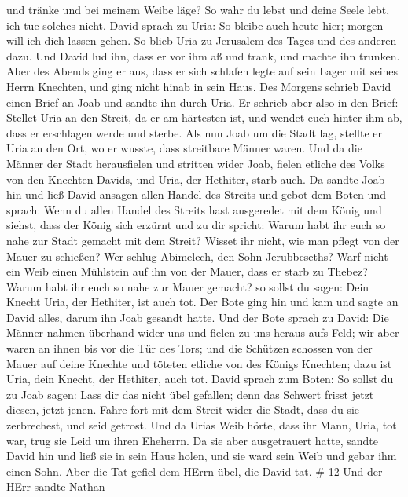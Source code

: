 und tränke und bei meinem Weibe läge? So wahr du lebst und deine Seele
lebt, ich tue solches nicht.  David sprach zu Uria: So
bleibe auch heute hier; morgen will ich dich lassen gehen. So blieb Uria
zu Jerusalem des Tages und des anderen dazu.  Und David lud
ihn, dass er vor ihm aß und trank, und machte ihn trunken. Aber des
Abends ging er aus, dass er sich schlafen legte auf sein Lager mit
seines Herrn Knechten, und ging nicht hinab in sein Haus. 
Des Morgens schrieb David einen Brief an Joab und sandte ihn durch Uria.
 Er schrieb aber also in den Brief: Stellet Uria an den
Streit, da er am härtesten ist, und wendet euch hinter ihm ab, dass er
erschlagen werde und sterbe.  Als nun Joab um die Stadt
lag, stellte er Uria an den Ort, wo er wusste, dass streitbare Männer
waren.  Und da die Männer der Stadt herausfielen und
stritten wider Joab, fielen etliche des Volks von den Knechten Davids,
und Uria, der Hethiter, starb auch.  Da sandte Joab hin und
ließ David ansagen allen Handel des Streits  und gebot dem
Boten und sprach: Wenn du allen Handel des Streits hast ausgeredet mit
dem König  und siehst, dass der König sich erzürnt und zu
dir spricht: Warum habt ihr euch so nahe zur Stadt gemacht mit dem
Streit? Wisset ihr nicht, wie man pflegt von der Mauer zu schießen?
 Wer schlug Abimelech, den Sohn Jerubbeseths? Warf nicht
ein Weib einen Mühlstein auf ihn von der Mauer, dass er starb zu Thebez?
Warum habt ihr euch so nahe zur Mauer gemacht? so sollst du sagen: Dein
Knecht Uria, der Hethiter, ist auch tot.  Der Bote ging hin
und kam und sagte an David alles, darum ihn Joab gesandt hatte.
 Und der Bote sprach zu David: Die Männer nahmen überhand
wider uns und fielen zu uns heraus aufs Feld; wir aber waren an ihnen
bis vor die Tür des Tors;  und die Schützen schossen von
der Mauer auf deine Knechte und töteten etliche von des Königs Knechten;
dazu ist Uria, dein Knecht, der Hethiter, auch tot.  David
sprach zum Boten: So sollst du zu Joab sagen: Lass dir das nicht übel
gefallen; denn das Schwert frisst jetzt diesen, jetzt jenen. Fahre fort
mit dem Streit wider die Stadt, dass du sie zerbrechest, und seid
getrost.  Und da Urias Weib hörte, dass ihr Mann, Uria, tot
war, trug sie Leid um ihren Eheherrn.  Da sie aber
ausgetrauert hatte, sandte David hin und ließ sie in sein Haus holen,
und sie ward sein Weib und gebar ihm einen Sohn. Aber die Tat gefiel dem
HErrn übel, die David tat. \# 12  Und der HErr sandte Nathan
